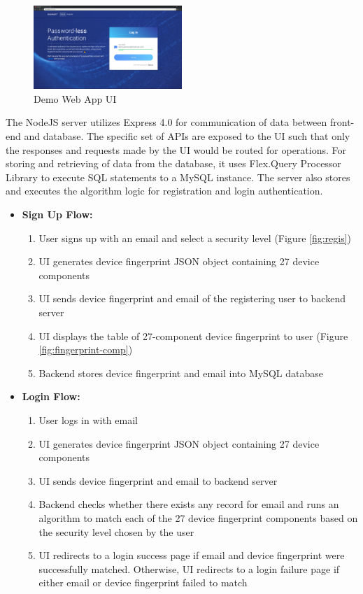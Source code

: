 \documentclass{acm_proc_article-sp}
\begin{document}
\begin{figure}[h]
    \centering
    \includegraphics[width=0.5\textwidth]{assets/fig4-ui-authentication.png}
    \caption{Demo Web App UI}
    \label{fig:login}
\end{figure}
The NodeJS server utilizes Express 4.0 for communication of data between front-end and database. The specific set of APIs are exposed to the UI such that only the responses and requests made by the UI would be routed for operations. For storing and retrieving of data from the database, it uses Flex.Query Processor Library to execute SQL statements to a MySQL instance. The server also stores and executes the algorithm logic for registration and login authentication. 


\begin{itemize}
    \item \textbf{Sign Up Flow:}
        \begin{enumerate}
            \item User signs up with an email and select a security level (Figure \ref{fig:regis})
            \item UI generates device fingerprint JSON object containing 27 device components
            \item UI sends device fingerprint and email of the registering user to backend server  
            \item UI displays the table of 27-component device fingerprint to user (Figure \ref{fig:fingerprint-comp})
            \item Backend stores device fingerprint and email into MySQL database
        \end{enumerate}

    \item \textbf{Login Flow:}
        \begin{enumerate}
            \item User logs in with email  
            \item UI generates device fingerprint JSON object containing 27 device components
            \item UI sends device fingerprint and email to backend server
            \item Backend checks whether there exists any record for email and runs an algorithm to match each of the 27 device fingerprint components based on the security level chosen by the user
            \item  UI redirects to a login success page if email and device fingerprint were successfully matched. Otherwise, UI redirects to a login failure page if either email or device fingerprint failed to match
        \end{enumerate}
\end{itemize}
\end{document}
